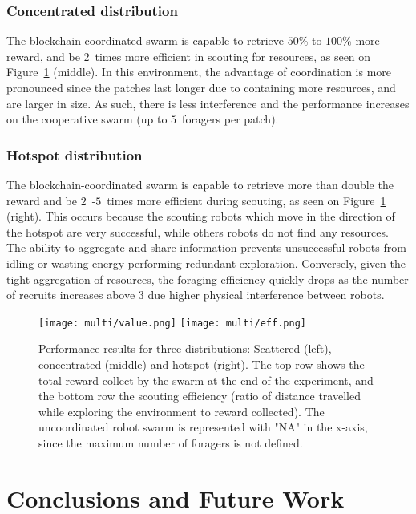 \documentclass[runningheads]{llncs}
\begin{document}
\vspace{-5mm}
\subsubsection{Concentrated distribution}
\label{sssec:concentrated}
The blockchain-coordinated swarm is capable to retrieve $50$\% to $100$\% more reward, and be $2$~times more efficient in scouting for resources, as seen on Figure~\ref{fig:results} (middle). In this environment, the advantage of coordination is more pronounced since the patches last longer due to containing more resources, and are larger in size. As such, there is less interference and the performance increases on the cooperative swarm (up to $5$~foragers per patch).

\vspace{-5mm}
\subsubsection{Hotspot distribution}
\label{sssec:hotspot}
The blockchain-coordinated swarm is capable to retrieve more than double the reward and be $2$~-$5$~times more efficient during scouting, as seen on Figure~\ref{fig:results} (right). This occurs because the scouting robots which move in the direction of the hotspot are very successful, while others robots do not find any resources. The ability to aggregate and share information prevents unsuccessful robots from idling or wasting energy performing redundant exploration. Conversely, given the tight aggregation of resources, the foraging efficiency quickly drops as the number of recruits increases above $3$ due higher physical interference between robots. 

\begin{figure}
  \centering
  \texttt{[image: multi/value.png]}
  \vspace{-2mm}
  \texttt{[image: multi/eff.png]}
  \caption{Performance results for three distributions: Scattered (left), concentrated (middle) and hotspot (right). The top row shows the total reward collect by the swarm at the end of the experiment, and the bottom row the scouting efficiency (ratio of distance travelled while exploring the environment to reward collected). The uncoordinated robot swarm is represented with "NA" in the x-axis, since the maximum number of foragers is not defined.}
  \label{fig:results}
\end{figure}

\section{Conclusions and Future Work}
\label{sec:conclusion}
\end{document}
